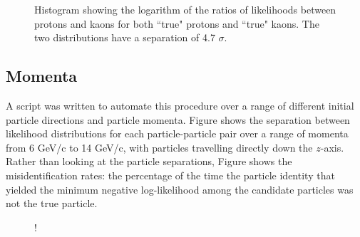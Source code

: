 \begin{figure}[]
\centering
{}
\caption[Particle identification separation for 7 GeV kaons and protons]{Histogram showing the logarithm of the ratios of likelihoods between protons and kaons for both ``true" protons and ``true" kaons. The two distributions have a separation of  4.7 $\sigma$.}
\label{fig:kaonprotonsep} 
\end{figure}

\subsection{Momenta}
A script was written to automate this procedure over a range of different initial particle directions and particle momenta. 
Figure \TODO{} shows the  separation between likelihood distributions for each particle-particle pair over a range of momenta from 6 GeV/c to 14 GeV/c, with particles travelling directly down the $z$-axis.
Rather than looking at the particle separations, Figure \TODO{} shows the misidentification rates: the percentage of the time the particle identity that yielded the minimum negative log-likelihood among the candidate particles was not the true particle.

\begin{figure}[]
\centering
{}
\caption[\TODO{}]{!}
\label{fig:centeredErrs} 
\end{figure}

